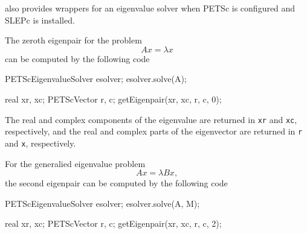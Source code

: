 \dolfin{} also provides wrappers for an eigenvalue solver 
when PETSc is configured and SLEPc \cite{www:slepc} is installed.

The zeroth eigenpair for the problem 
\begin{equation}
  Ax = \lambda x
\end{equation}
can be computed by the following code
\begin{code} 
PETScEigenvalueSolver esolver; 
esolver.solve(A);

real xr, xc;
PETScVector r, c;
getEigenpair(xr, xc, r, c, 0);
\end{code} 
%
The real and complex components of the eigenvalue are returned in \texttt{xr}
and \texttt{xc}, respectively, and the real and complex parts of the eigenvector
are returned in \texttt{r} and \texttt{x}, respectively.

For the generalied eigenvalue problem
\begin{equation}
  A x = \lambda B x,
\end{equation}
%
the second eigenpair can be computed by the following code
%
\begin{code} 
PETScEigenvalueSolver esolver; 
esolver.solve(A, M);

real xr, xc;
PETScVector r, c;
getEigenpair(xr, xc, r, c, 2);
\end{code} 











